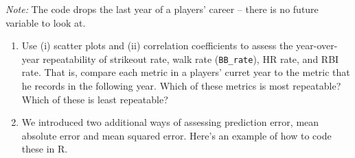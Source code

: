 \documentclass[]{article}
\newenvironment{Shaded}{\begin{snugshade}}{\end{snugshade}}
\newcommand{\DataTypeTok}[1]{\textcolor[rgb]{0.13,0.29,0.53}{#1}}
\newcommand{\DecValTok}[1]{\textcolor[rgb]{0.00,0.00,0.81}{#1}}
\newcommand{\KeywordTok}[1]{\textcolor[rgb]{0.13,0.29,0.53}{\textbf{#1}}}
\newcommand{\NormalTok}[1]{#1}
\newcommand{\OperatorTok}[1]{\textcolor[rgb]{0.81,0.36,0.00}{\textbf{#1}}}
\newcommand{\StringTok}[1]{\textcolor[rgb]{0.31,0.60,0.02}{#1}}
\begin{document}
\begin{Shaded}
\end{Shaded}

\emph{Note:} The code drops the last year of a players' career -- there
is no future variable to look at.

\begin{enumerate}
\def\labelenumi{\arabic{enumi}.}
\setcounter{enumi}{9}
\item
  Use (i) scatter plots and (ii) correlation coefficients to assess the
  year-over-year repeatability of strikeout rate, walk rate
  (\texttt{BB\_rate}), HR rate, and RBI rate. That is, compare each
  metric in a players' curret year to the metric that he records in the
  following year. Which of these metrics is most repeatable? Which of
  these is least repeatable?
\item
  We introduced two additional ways of assessing prediction error, mean
  absolute error and mean squared error. Here's an example of how to
  code these in R.
\end{enumerate}
\end{document}
